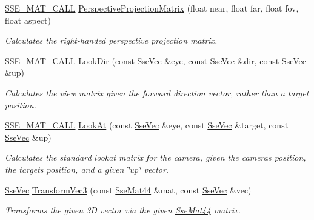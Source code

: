 \begin{DoxyCompactItemize}
\hyperlink{ssemat__math__defs_8h_a741f88d5589197d03fea9ab2b7622b8a}{S\+S\+E\+\_\+\+M\+A\+T\+\_\+\+C\+A\+L\+L} \hyperlink{classgofxmath_1_1_sse_mat44_a701f5bfeb4c0c0d4b080a9ad00f910ce}{Perspective\+Projection\+Matrix} (float near, float far, float fov, float aspect)
\begin{DoxyCompactList}\small\item\em Calculates the right-\/handed perspective projection matrix. \end{DoxyCompactList}\item 
\hyperlink{ssemat__math__defs_8h_a741f88d5589197d03fea9ab2b7622b8a}{S\+S\+E\+\_\+\+M\+A\+T\+\_\+\+C\+A\+L\+L} \hyperlink{classgofxmath_1_1_sse_mat44_a67dc21f3890ac0ef9a36b05b71ad36db}{Look\+Dir} (const \hyperlink{namespacegofxmath_a634570ddcd2496053ee966227080e02f}{Sse\+Vec} \&eye, const \hyperlink{namespacegofxmath_a634570ddcd2496053ee966227080e02f}{Sse\+Vec} \&dir, const \hyperlink{namespacegofxmath_a634570ddcd2496053ee966227080e02f}{Sse\+Vec} \&up)
\begin{DoxyCompactList}\small\item\em Calculates the view matrix given the forward direction vector, rather than a target position. \end{DoxyCompactList}\item 
\hyperlink{ssemat__math__defs_8h_a741f88d5589197d03fea9ab2b7622b8a}{S\+S\+E\+\_\+\+M\+A\+T\+\_\+\+C\+A\+L\+L} \hyperlink{classgofxmath_1_1_sse_mat44_abc7554e34178f4e36a906a12ea469c64}{Look\+At} (const \hyperlink{namespacegofxmath_a634570ddcd2496053ee966227080e02f}{Sse\+Vec} \&eye, const \hyperlink{namespacegofxmath_a634570ddcd2496053ee966227080e02f}{Sse\+Vec} \&target, const \hyperlink{namespacegofxmath_a634570ddcd2496053ee966227080e02f}{Sse\+Vec} \&up)
\begin{DoxyCompactList}\small\item\em Calculates the standard lookat matrix for the camera, given the camera\textquotesingle{}s position, the target\textquotesingle{}s position, and a given \char`\"{}up\char`\"{} vector. \end{DoxyCompactList}\item 
\hyperlink{namespacegofxmath_a634570ddcd2496053ee966227080e02f}{Sse\+Vec} \hyperlink{classgofxmath_1_1_sse_mat44_a7f0f017f89ae1ba6cf642fba6ce8e4cd}{Transform\+Vec3} (const \hyperlink{classgofxmath_1_1_sse_mat44}{Sse\+Mat44} \&mat, const \hyperlink{namespacegofxmath_a634570ddcd2496053ee966227080e02f}{Sse\+Vec} \&vec)
\begin{DoxyCompactList}\small\item\em Transforms the given 3\+D vector via the given \hyperlink{classgofxmath_1_1_sse_mat44}{Sse\+Mat44} matrix. \end{DoxyCompactList}\end{DoxyCompactItemize}



